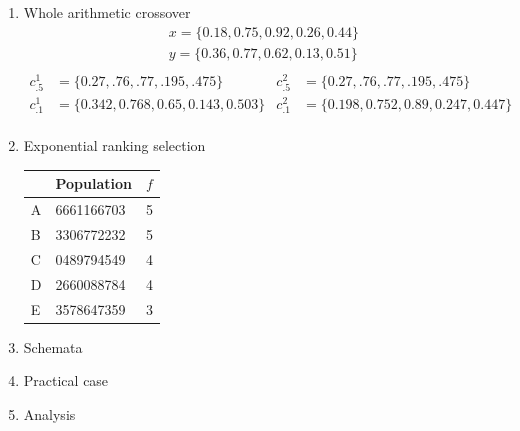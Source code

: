 \documentclass{article}
\begin{document}
\begin{enumerate}
    \item Whole arithmetic crossover
    \begin{align*}
        x=\{ 0.18, 0.75, 0.92, 0.26, 0.44 \}\\
        y=\{ 0.36, 0.77, 0.62, 0.13, 0.51 \}\\
    \end{align*}
    \begin{align*}
        c^{1}_{.5} &= \{ 0.27, .76, .77, .195, .475 \} & c^{2}_{.5} &= \{ 0.27, .76, .77, .195, .475 \}\\
        c^1_{.1} &= \{ 0.342, 0.768, 0.65, 0.143 ,0.503 \} & c^2_{.1} &= \{ 0.198, 0.752, 0.89, 0.247 ,0.447\}\\
    \end{align*}
    
    \pagebreak
    \item Exponential ranking selection 
    \begin{table}[h]
        \centering
        \begin{tabular}{l|l|l}
            & Population & $f$ \\
            \hline
            A & 6661166703  & 5 \\
            B & 3306772232  & 5 \\
            C & 0489794549  & 4 \\
            D & 2660088784  & 4 \\
            E & 3578647359  & 3
        \end{tabular}
    \end{table}


    \item Schemata
    
    
    \item Practical case
    

    \item Analysis
    

\end{enumerate}
\end{document}
